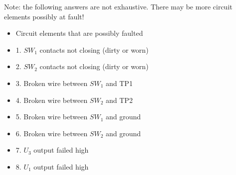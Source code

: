 \vskip 10pt

Note: the following answers are not exhaustive.  There may be more circuit elements possibly at fault!

\begin{itemize}
\item{} Circuit elements that are possibly faulted
\item{1.} $SW_1$ contacts not closing (dirty or worn)
\item{2.} $SW_2$ contacts not closing (dirty or worn)
\item{3.} Broken wire between $SW_1$ and TP1
\item{4.} Broken wire between $SW_2$ and TP2
\item{5.} Broken wire between $SW_1$ and ground
\item{6.} Broken wire between $SW_2$ and ground
\item{7.} $U_3$ output failed high
\item{8.} $U_1$ output failed high
\end{itemize}




